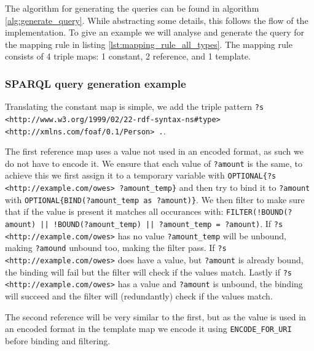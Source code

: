 
The algorithm for generating the queries can be found in algorithm \ref{alg:generate_query}. While abstracting some details, this follows the flow of the implementation. To give an example we will analyse and generate the query for the mapping rule in listing \ref{lst:mapping_rule_all_types}. The mapping rule consists of 4 triple maps: 1 constant, 2 reference, and 1 template. 
\subsubsection{SPARQL query generation example}

Translating the constant map is simple, we add the triple pattern \texttt{?s <http://www.w3.org/1999/02/22-rdf-syntax-ns\#type> <http://xmlns.com/foaf/0.1/Person> .}. 

The first reference map uses a value not used in an encoded format, as such we do not have to encode it. We ensure that each value of \texttt{?amount} is the same, to achieve this we first assign it to a temporary variable with \texttt{OPTIONAL\{?s <http://example.com/owes> ?amount\_temp\}} and then try to bind it to \texttt{?amount} with \texttt{OPTIONAL\{BIND(?amount\_temp as ?amount)\}}. We then filter to make sure that if the value is present it matches all occurances with: \texttt{FILTER(!BOUND(?amount) || !BOUND(?amount\_temp) || ?amount\_temp = ?amount)}. If \texttt{?s <http://example.com/owes>} has no value \texttt{?amount\_temp} will be unbound, making \texttt{?amound} unbound too, making the filter pass. If \texttt{?s <http://example.com/owes>} does have a value, but \texttt{?amount} is already bound, the binding will fail but the filter will check if the values match. Lastly if \texttt{?s <http://example.com/owes>} has a value and \texttt{?amount} is unbound, the binding will succeed and the filter will (redundantly) check if the values match. 

The second reference will be very similar to the first, but as the value is used in an encoded format in the template map we encode it using \texttt{ENCODE\_FOR\_URI} before binding and filtering.

